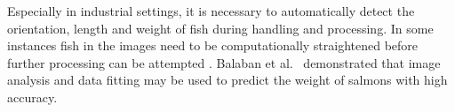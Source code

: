 \documentclass[conference]{IEEEtran}
\begin{document}
Especially in industrial settings, it is necessary to automatically
detect the orientation, length and weight of fish during handling
and processing.
In some instances fish in the images need to be computationally straightened
before further processing can be attempted \cite{MuozBenavent2018EnhancedFB}.
Balaban et al.~\cite{Balaban2010UsingIA} demonstrated that image analysis
and data fitting may be used to predict the weight of salmons with high
accuracy.
\end{document}

